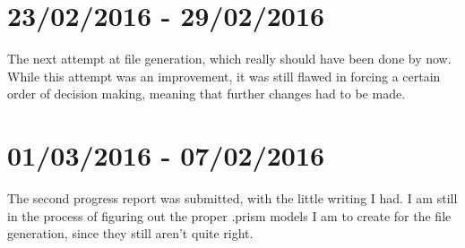 \documentclass[11pt, a4paper]{article}
\begin{document}
\section{23/02/2016 - 29/02/2016}
The next attempt at file generation, which really should have been done by now.
While this attempt was an improvement, it was still flawed in forcing a certain
order of decision making, meaning that further changes had to be made.

\section{01/03/2016 - 07/02/2016}
The second progress report was submitted, with the little writing I had. I am
still in the process of figuring out the proper .prism models I am to create for
the file generation, since they still aren't quite right.
\end{document}

